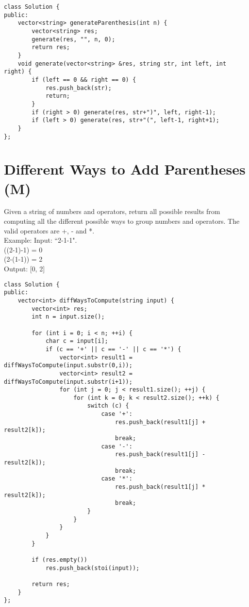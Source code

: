 \begin{lstlisting}
class Solution {
public:
    vector<string> generateParenthesis(int n) {
        vector<string> res;
        generate(res, "", n, 0);
        return res;
    }
    void generate(vector<string> &res, string str, int left, int right) {
        if (left == 0 && right == 0) {
            res.push_back(str);
            return;
        }
        if (right > 0) generate(res, str+")", left, right-1);
        if (left > 0) generate(res, str+"(", left-1, right+1);
    }
};
\end{lstlisting}


\section{Different Ways to Add Parentheses (M)}
Given a string of numbers and operators, return all possible results from computing all the different possible ways to group numbers and operators. The valid operators are +, - and *.\\

Example: 
Input: ``2-1-1". \\
((2-1)-1) = 0\\
(2-(1-1)) = 2\\
Output: [0, 2]\\

\begin{lstlisting}
class Solution {
public:
    vector<int> diffWaysToCompute(string input) {
        vector<int> res;
        int n = input.size();
        
        for (int i = 0; i < n; ++i) {
            char c = input[i];
            if (c == '+' || c == '-' || c == '*') {
                vector<int> result1 = diffWaysToCompute(input.substr(0,i));
                vector<int> result2 = diffWaysToCompute(input.substr(i+1));
                for (int j = 0; j < result1.size(); ++j) {
                    for (int k = 0; k < result2.size(); ++k) {
                        switch (c) {
                            case '+':
                                res.push_back(result1[j] + result2[k]);
                                break;
                            case '-':
                                res.push_back(result1[j] - result2[k]);
                                break;
                            case '*':
                                res.push_back(result1[j] * result2[k]);
                                break;
                        }
                    }
                }
            }
        }
        
        if (res.empty())
            res.push_back(stoi(input));
            
        return res;
    }
};
\end{lstlisting}


